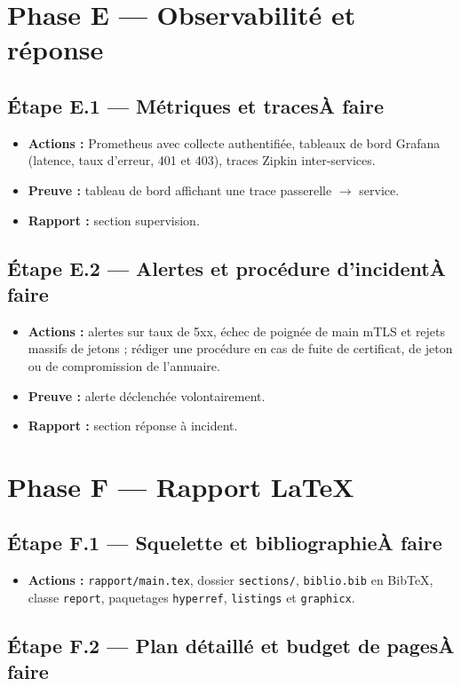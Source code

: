 \documentclass[12pt,a4paper]{article}
\newcommand{\code}[1]{\texttt{\small #1}}
\newcommand{\fait}{\hfill\textcolor{green!45!black}{\small\textbf{Fait}}}
\newcommand{\afaire}{\hfill\textcolor{orange!80!black}{\small\textbf{\`A faire}}}
\newcommand{\etape}[2]{%
  \subsection*{#1\ifstrequal{#2}{f}{\fait}{\afaire}}%
}
\begin{document}
\section{Phase E --- Observabilit\'e et r\'eponse}

\etape{\'Etape E.1 --- M\'etriques et traces}{a}
\begin{itemize}[leftmargin=1.4em,itemsep=0.1em]
  \item \textbf{Actions :} Prometheus avec collecte authentifi\'ee, tableaux de bord Grafana
        (latence, taux d'erreur, 401 et 403), traces Zipkin inter-services.
  \item \textbf{Preuve :} tableau de bord affichant une trace passerelle $\rightarrow$ service.
  \item \textbf{Rapport :} section supervision.
\end{itemize}

\etape{\'Etape E.2 --- Alertes et proc\'edure d'incident}{a}
\begin{itemize}[leftmargin=1.4em,itemsep=0.1em]
  \item \textbf{Actions :} alertes sur taux de 5xx, \'echec de poign\'ee de main mTLS et rejets
        massifs de jetons ; r\'ediger une proc\'edure en cas de fuite de certificat, de jeton
        ou de compromission de l'annuaire.
  \item \textbf{Preuve :} alerte d\'eclench\'ee volontairement.
  \item \textbf{Rapport :} section r\'eponse \`a incident.
\end{itemize}

\section{Phase F --- Rapport \LaTeX}

\etape{\'Etape F.1 --- Squelette et bibliographie}{a}
\begin{itemize}[leftmargin=1.4em,itemsep=0.1em]
  \item \textbf{Actions :} \code{rapport/main.tex}, dossier \code{sections/},
        \code{biblio.bib} en BibTeX, classe \code{report}, paquetages \code{hyperref},
        \code{listings} et \code{graphicx}.
\end{itemize}

\etape{\'Etape F.2 --- Plan d\'etaill\'e et budget de pages}{a}
\end{document}
